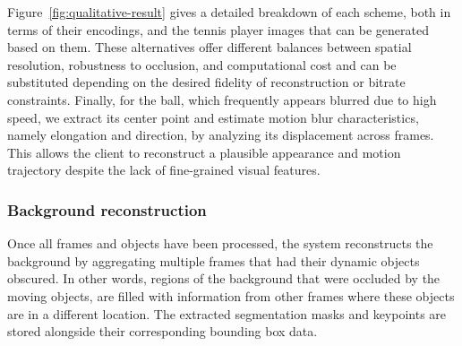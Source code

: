 \documentclass[manuscript, screen]{acmart}
\begin{document}
Figure~\ref{fig:qualitative-result} gives a detailed breakdown of each scheme, both in terms of their encodings, and the tennis player images that can be generated based on them.
These alternatives offer different balances between spatial resolution, robustness to occlusion, and computational cost and can be substituted depending on the desired fidelity of reconstruction or bitrate constraints.
Finally, for the ball, which frequently appears blurred due to high speed, we extract its center point and estimate motion blur characteristics, namely elongation and direction, by analyzing its displacement across frames. This allows the client to reconstruct a plausible appearance and motion trajectory despite the lack of fine-grained visual features.

\subsubsection*{Background reconstruction}
Once all frames and objects have been processed, the system reconstructs the background by aggregating multiple frames that had their dynamic objects obscured. 
In other words, regions of the background that were occluded by the moving objects, are filled with information from other frames where these objects are in a different location.
The extracted segmentation masks and keypoints are stored alongside their corresponding bounding box data.
\end{document}
